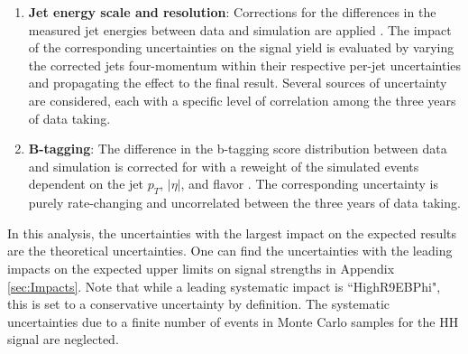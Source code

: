 \begin{enumerate}
  \item \textbf{Jet energy scale and resolution}: Corrections for the differences in the measured jet energies between data and simulation are applied \cite{Khachatryan:2016kdb}. The impact of the corresponding uncertainties on the signal yield is evaluated by varying the corrected jets four-momentum within their respective per-jet uncertainties and propagating the effect to the final result. Several sources of uncertainty are considered, each with a specific level of correlation among the three years of data taking. 

  \item \textbf{B-tagging}: The difference in the b-tagging score distribution between data and simulation is corrected for with a reweight of the simulated events dependent on the jet $p_T$, $|\eta|$, and flavor \cite{Sirunyan:2017ezt}. The corresponding uncertainty is purely rate-changing and uncorrelated between the three years of data taking.


\end{enumerate}

In this analysis, the uncertainties with the largest impact on the expected results are the theoretical uncertainties. One can find the uncertainties with the leading impacts on the expected upper limits on signal strengths in Appendix \ref{sec:Impacts}. Note that while a leading systematic impact is ``HighR9EBPhi", this is set to a conservative uncertainty by definition. 
The systematic uncertainties due to a finite number of events in Monte Carlo samples for the HH signal are neglected.

